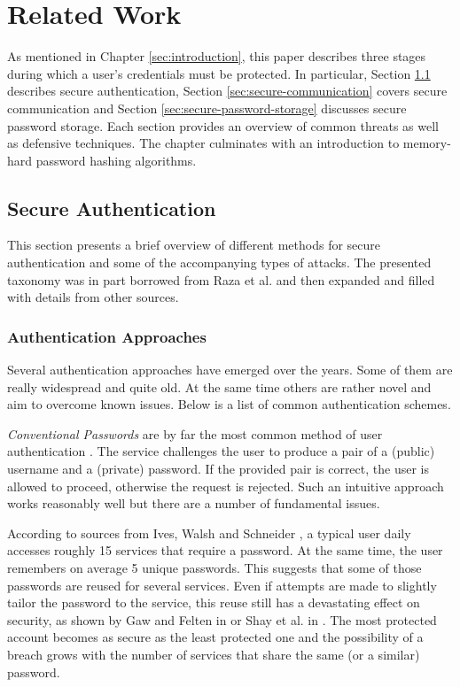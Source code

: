 \chapter{Related Work}
\label{chapter:related-work}

As mentioned in Chapter \ref{sec:introduction}, this paper describes three stages during which a user's credentials must be protected. In particular, Section \ref{sec:secure-authentication} describes secure authentication, Section \ref{sec:secure-communication} covers secure communication and Section \ref{sec:secure-password-storage} discusses secure password storage. Each section provides an overview of common threats as well as defensive techniques. The chapter culminates with an introduction to memory-hard password hashing algorithms.

\section{Secure Authentication}
\label{sec:secure-authentication}

This section presents a brief overview of different methods for secure authentication and some of the accompanying types of attacks. The presented taxonomy was in part borrowed from Raza et al. \cite{raza:2012:password-attacks-survey} and then expanded and filled with details from other sources.

\subsection{Authentication Approaches}
\label{sec:authentication-approaches}

Several authentication approaches have emerged over the years. Some of them are really widespread and quite old.  At the same time others are rather novel and aim to overcome known issues. Below is a list of common authentication schemes.

\emph{Conventional Passwords} are by far the most common method of user authentication \cite{bonneau:2015:passwords-and-evolution-of-auth}. The service challenges the user to produce a pair of a (public) username and a (private) password. If the provided pair is correct, the user is allowed to proceed, otherwise the request is rejected. Such an intuitive approach works reasonably well but there are a number of fundamental issues.

 According to sources from Ives, Walsh and Schneider \cite{ives:2004:domino}, a typical user daily accesses roughly 15 services that require a password. At the same time, the user remembers on average 5 unique passwords. This suggests that some of those passwords are reused for several services. Even if attempts are made to slightly tailor the password to the service, this reuse still has a devastating effect on security, as shown by Gaw and Felten in \cite{gaw:2006:password} or Shay et al. in \cite{shay2010encountering}. The most protected account becomes as secure as the least protected one and the possibility of a breach grows with the number of services that share the same (or a similar) password.

